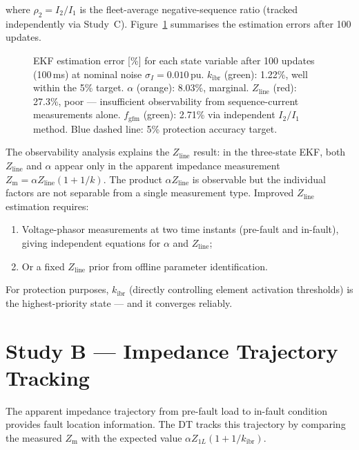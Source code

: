 \documentclass[11pt,a4paper]{article}
\begin{document}
where $\rho_2 = I_2/I_1$ is the fleet-average negative-sequence ratio
(tracked independently via Study~C).  Figure~\ref{fig:ekf} summarises
the estimation errors after 100 updates.

\begin{figure}[htbp]
  \centering
  \resizebox{0.88\textwidth}{!}{}
  \caption{EKF estimation error [\%] for each state variable after 100
           updates (100\,ms) at nominal noise $\sigma_I=0.010$\,pu.
           $k_\mathrm{ibr}$ (green): 1.22\%, well within the 5\% target.
           $\alpha$ (orange): 8.03\%, marginal.  $Z_\mathrm{line}$ (red):
           27.3\%, poor --- insufficient observability from sequence-current
           measurements alone.  $f_\mathrm{gfm}$ (green): 2.71\% via
           independent $I_2/I_1$ method.  Blue dashed line: 5\% protection
           accuracy target.}
  \label{fig:ekf}
\end{figure}

\noindent
The observability analysis explains the $Z_\mathrm{line}$ result: in the
three-state EKF, both $Z_\mathrm{line}$ and $\alpha$ appear only in the
apparent impedance measurement $Z_\mathrm{m} = \alpha Z_\mathrm{line}(1+1/k)$.
The product $\alpha Z_\mathrm{line}$ is observable but the individual factors
are not separable from a single measurement type.  Improved $Z_\mathrm{line}$
estimation requires:
\begin{enumerate}
  \item Voltage-phasor measurements at two time instants (pre-fault and
    in-fault), giving independent equations for $\alpha$ and $Z_\mathrm{line}$;
  \item Or a fixed $Z_\mathrm{line}$ prior from offline parameter identification.
\end{enumerate}

For protection purposes, $k_\mathrm{ibr}$ (directly controlling element
activation thresholds) is the highest-priority state --- and it converges
reliably.

\section{Study B --- Impedance Trajectory Tracking}
\label{sec:studyB}

The apparent impedance trajectory from pre-fault load to in-fault condition
provides fault location information.  The DT tracks this trajectory by
comparing the measured $Z_\mathrm{m}$ with the expected value
$\alpha Z_{1L}(1+1/k_\mathrm{ibr})$.
\end{document}
